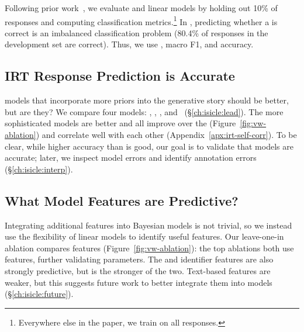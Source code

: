 Following prior work~\citep{wu2020virt}, we evaluate \irt{} and linear models by holding out 10\% of responses and computing classification metrics.\footnote{Everywhere else in the paper, we train on all responses.}
In \squad{}, predicting whether a \resp{} is correct is an imbalanced
classification problem (80.4\% of responses in the development set are
correct).
Thus, we use , macro F1, and accuracy.

\subsection{IRT Response Prediction is Accurate}
\label{ch:isicle:irt-compare}

\irt{} models that incorporate more priors into the generative story should be better, but are they?
We compare four \irt{} models: , , , and ~(\S\ref{ch:isicle:lead}).
The more sophisticated models are better and all improve over the
 (Figure~\ref{fig:vw-ablation}) and correlate well with each other (Appendix~\ref{apx:irt-self-corr}).
To be clear, while higher accuracy than  is good, our goal is to validate that \irt{} models are accurate; later, we inspect model errors and identify annotation errors (\S\ref{ch:isicle:interp}).

\begin{figure*}[th]
    \centering
    \caption{
        We compare each \irt{} and linear model () by how well they predict \subj{} \resps{}.
        We focus on  since predicting responses is an imbalanced classification problem (most \subjs{} are correct).
        Under that metric, all \irt{} models improve over the best
        , and the strongest  ablation only uses \irt{} features.
        That textual features are predictive in the  suggests they could improve future models.
    }
    \label{fig:vw-ablation}
\end{figure*}


\subsection{What Model Features are Predictive?}

Integrating additional features into Bayesian models is not trivial,
so we instead use the flexibility of linear models to identify useful
features.
Our leave-one-in ablation compares features (Figure~\ref{fig:vw-ablation}):
the top ablations both use \irt{} features, further validating
\irt{} parameters.
The \subj{} and \itm{} identifier features are also
strongly predictive, but \itm{} is the stronger of the two.
Text-based features are weaker, but this suggests future work to
better integrate them into \irt{} models (\S\ref{ch:isicle:future}).



